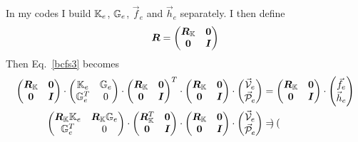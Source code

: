 In my codes I build ${\mathbb{K}}_e$, ${\mathbb{G}}_e$, $\vec{f}_e$ and $\vec{h}_e$ separately. 
I then define 
\[
{\bm R} = 
\begin{pmatrix}
{\bm R}_{\mathbb{K}} & {\bm 0} \\
{\bm 0} & {\bm I} 
\end{pmatrix}
\]
Then Eq.~\eqref{bcfs3} becomes
\begin{align}
\begin{pmatrix}
{\bm R}_{\mathbb{K}} & {\bm 0} \\
{\bm 0} & {\bm I} 
\end{pmatrix}
\cdot
\begin{pmatrix}
{\mathbb{K}}_e & {\mathbb{G}}_e \\
{\mathbb{G}}_e^T & 0 
\end{pmatrix}
\cdot
\begin{pmatrix}
{\bm R}_{\mathbb{K}} & {\bm 0} \\
{\bm 0} & {\bm I} 
\end{pmatrix}^T 
\cdot
\begin{pmatrix}
{\bm R}_{\mathbb{K}} & {\bm 0} \\
{\bm 0} & {\bm I} 
\end{pmatrix}
\cdot
\begin{pmatrix}
\vec{\cal V}_e \\ \vec{\cal P}_e
\end{pmatrix}
&=
\begin{pmatrix}
{\bm R}_{\mathbb{K}} & {\bm 0} \\
{\bm 0} & {\bm I} 
\end{pmatrix}
\cdot
\begin{pmatrix}
\vec{f}_e \\ \vec{h}_{e}
\end{pmatrix}  
\nonumber\\
\begin{pmatrix}
{\bm R}_{\mathbb{K}} {\mathbb{K}}_e & {\bm R}_{\mathbb{K}} {\mathbb{G}}_e \\
{\mathbb{G}}_e^T & 0 
\end{pmatrix}
\cdot
\begin{pmatrix}
{\bm R}_{\mathbb{K}}^T & {\bm 0} \\
{\bm 0} & {\bm I} 
\end{pmatrix} 
\cdot
\begin{pmatrix}
{\bm R}_{\mathbb{K}} & {\bm 0} \\
{\bm 0} & {\bm I} 
\end{pmatrix}
\cdot
\begin{pmatrix}
\vec{\cal V}_e \\ \vec{\cal P}_e
\end{pmatrix}
&=
\begin{pmatrix}

\end{pmatrix}
\end{align}
